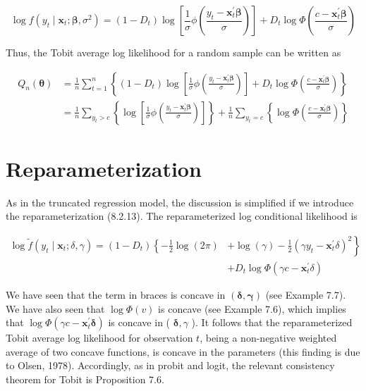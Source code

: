 \documentclass[10pt]{article}
\begin{document}
\begin{equation*}
\log f\left(y_{t} \mid \mathbf{x}_{t} ; \boldsymbol{\beta}, \sigma^{2}\right)=\left(1-D_{t}\right) \log \left[\frac{1}{\sigma} \phi\left(\frac{y_{t}-\mathbf{x}_{t}^{\prime} \boldsymbol{\beta}}{\sigma}\right)\right]+D_{t} \log \Phi\left(\frac{c-\mathbf{x}_{t}^{\prime} \boldsymbol{\beta}}{\sigma}\right) \tag{8.3.8}
\end{equation*}


Thus, the Tobit average log likelihood for a random sample can be written as


\begin{align*}
Q_{n}(\boldsymbol{\theta}) & =\frac{1}{n} \sum_{t=1}^{n}\left\{\left(1-D_{t}\right) \log \left[\frac{1}{\sigma} \phi\left(\frac{y_{t}-\mathbf{x}_{t}^{\prime} \boldsymbol{\beta}}{\sigma}\right)\right]+D_{t} \log \Phi\left(\frac{c-\mathbf{x}_{t}^{\prime} \boldsymbol{\beta}}{\sigma}\right)\right\} \\
& =\frac{1}{n} \sum_{y_{t}>c}\left\{\log \left[\frac{1}{\sigma} \phi\left(\frac{y_{t}-\mathbf{x}_{t}^{\prime} \boldsymbol{\beta}}{\sigma}\right)\right]\right\}+\frac{1}{n} \sum_{y_{t}=c}\left\{\log \Phi\left(\frac{c-\mathbf{x}_{t}^{\prime} \boldsymbol{\beta}}{\sigma}\right)\right\} \tag{8.3.9}
\end{align*}


\section*{Reparameterization}
As in the truncated regression model, the discussion is simplified if we introduce the reparameterization (8.2.13). The reparameterized log conditional likelihood is


\begin{align*}
\log \tilde{f}\left(y_{t} \mid \mathbf{x}_{t} ; \delta, \gamma\right)=\left(1-D_{t}\right)\left\{-\frac{1}{2} \log (2 \pi)\right. & \left.+\log (\gamma)-\frac{1}{2}\left(\gamma y_{t}-\mathbf{x}_{t}^{\prime} \delta\right)^{2}\right\} \\
& +D_{t} \log \Phi\left(\gamma c-\mathbf{x}_{t}^{\prime} \delta\right) \tag{8.3.10}
\end{align*}


We have seen that the term in braces is concave in $(\boldsymbol{\delta}, \boldsymbol{\gamma})$ (see Example 7.7). We have also seen that $\log \Phi(v)$ is concave (see Example 7.6), which implies that $\log \Phi\left(\gamma c-\mathbf{x}_{t}^{\prime} \boldsymbol{\delta}\right)$ is concave in ( $\boldsymbol{\delta}, \gamma$ ). It follows that the reparameterized Tobit average log likelihood for observation $t$, being a non-negative weighted average of two concave functions, is concave in the parameters (this finding is due to Olsen, 1978). Accordingly, as in probit and logit, the relevant consistency theorem for Tobit is Proposition 7.6.
\end{document}
